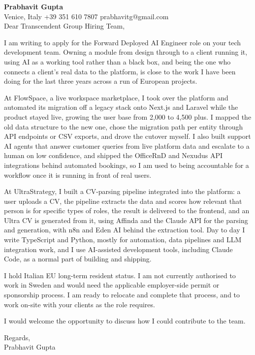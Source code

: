 \documentclass[a4paper,10.5pt]{article}
\begin{document}
\textbf{Prabhavit Gupta}\\
Venice, Italy \textbar{} +39 351 610 7807 \textbar{} prabhavitg@gmail.com\\[10pt]
Dear Transcendent Group Hiring Team,

I am writing to apply for the Forward Deployed AI Engineer role on your tech development team. Owning a module from design through to a client running it, using AI as a working tool rather than a black box, and being the one who connects a client's real data to the platform, is close to the work I have been doing for the last three years across a run of European projects.

At FlowSpace, a live workspace marketplace, I took over the platform and automated its migration off a legacy stack onto Next.js and Laravel while the product stayed live, growing the user base from 2,000 to 4,500 plus. I mapped the old data structure to the new one, chose the migration path per entity through API endpoints or CSV exports, and drove the cutover myself. I also built support AI agents that answer customer queries from live platform data and escalate to a human on low confidence, and shipped the OfficeRnD and Nexudus API integrations behind automated bookings, so I am used to being accountable for a workflow once it is running in front of real users.

At UltraStrategy, I built a CV-parsing pipeline integrated into the platform: a user uploads a CV, the pipeline extracts the data and scores how relevant that person is for specific types of roles, the result is delivered to the frontend, and an Ultra CV is generated from it, using Affinda and the Claude API for the parsing and generation, with n8n and Eden AI behind the extraction tool. Day to day I write TypeScript and Python, mostly for automation, data pipelines and LLM integration work, and I use AI-assisted development tools, including Claude Code, as a normal part of building and shipping.

I hold Italian EU long-term resident status. I am not currently authorised to work in Sweden and would need the applicable employer-side permit or sponsorship process. I am ready to relocate and complete that process, and to work on-site with your clients as the role requires.

I would welcome the opportunity to discuss how I could contribute to the team.

Regards,\\
Prabhavit Gupta
\end{document}

